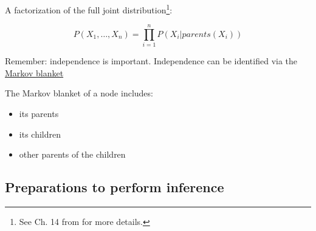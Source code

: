 
\begin{frame}\frametitle{\secname}
    
A factorization of the full joint distribution\footnote{See Ch. 14 from \citep{russell2016artificial} for more details.}:

\begin{equation}
P(X_{1},\ldots,X_{n}) = \prod_{i=1}^{n} P(X_{i} | parents(X_{i}))
\end{equation}
    
Remember: independence is important. Independence can be identified via the 
\underline{Markov blanket}

The Markov blanket of a node includes:
\begin{itemize}
\item its parents
\item its children
\item other parents of the children    
\end{itemize}
    
\end{frame}

\subsection{Preparations to perform inference}

